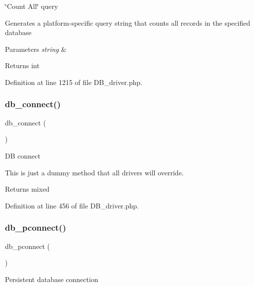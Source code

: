 \char`\"{}\+Count All\char`\"{} query

Generates a platform-\/specific query string that counts all records in the specified database


\begin{DoxyParams}{Parameters}
{\em string} & \\
\hline
\end{DoxyParams}
\begin{DoxyReturn}{Returns}
int 
\end{DoxyReturn}


Definition at line 1215 of file D\+B\+\_\+driver.\+php.

\mbox{\label{class_c_i___d_b__driver_a6aa545dcb7768f0b62d37cdcf7f09adc}} 
\subsubsection{\texorpdfstring{db\_connect()}{db\_connect()}}
{\footnotesize\ttfamily db\+\_\+connect (\begin{DoxyParamCaption}{ }\end{DoxyParamCaption})}

DB connect

This is just a dummy method that all drivers will override.

\begin{DoxyReturn}{Returns}
mixed 
\end{DoxyReturn}


Definition at line 456 of file D\+B\+\_\+driver.\+php.

\mbox{\label{class_c_i___d_b__driver_a0f69e662bd02de5bcf98647068e7c653}} 
\subsubsection{\texorpdfstring{db\_pconnect()}{db\_pconnect()}}
{\footnotesize\ttfamily db\+\_\+pconnect (\begin{DoxyParamCaption}{ }\end{DoxyParamCaption})}

Persistent database connection

